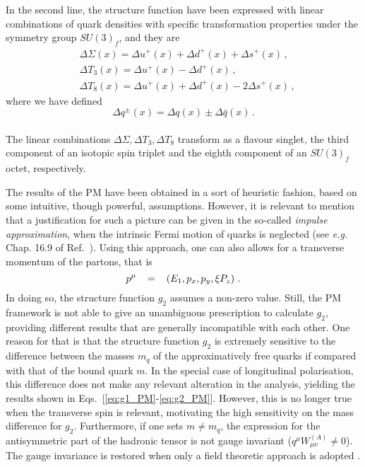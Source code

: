 In the second line, the structure function have been expressed with linear combinations of quark densities with specific transformation properties under the symmetry group $SU(3)_{f}$, and they are
\begin{align}
  & \Delta \Sigma (x) = \Delta u^{+} (x) + \Delta d^{+} (x) +\Delta s^{+} (x) \,, \\
  & \Delta T_3 (x) = \Delta u^{+} (x) - \Delta d^{+} (x) \,, \\
  & \Delta T_8 (x) = \Delta u^{+} (x) + \Delta d^{+} (x) - 2 \Delta s^{+} (x) \,,
\end{align}
where we have defined\\
\begin{equation}
 \Delta q^{\pm}(x) = \Delta q(x) \pm \Delta \bar{q}(x) \,.
\end{equation}
\\
The linear combinations $\Delta \Sigma, \Delta T_3, \Delta T_8$ transform as a flavour singlet, the third component of an isotopic spin triplet and the eighth component of an $SU(3)_{f}$ octet, respectively.\par 
The results of the PM have been obtained in a sort of heuristic fashion, based on some intuitive, though powerful, assumptions. However, it is relevant to mention that a justification for such a picture can be given in the so-called \textit{impulse approximation}, when the intrinsic Fermi motion of quarks is neglected (see \textit{e.g.} Chap. 16.9 of Ref.~\cite{leader_predazzi_1996}). Using this approach, one can also allows for a transverse momentum of the partons, that is 
\begin{equation}
  p^{\mu} \hspace{3mm}  = \hspace{3mm} \left( E_1, p_x, p_y, \xi P_{z} \right)\,.
\end{equation}
In doing so, the structure function $g_2$ assumes a non-zero value. Still, the PM framework is not able to give an unambiguous prescription to calculate $g_2$, providing different results that are generally incompatible with each other. One reason for that is that the structure function $g_2$ is extremely sensitive to the difference between the masses $m_q$ of the approximatively free quarks if compared with that of the bound quark $m$. In the special case of longitudinal polarisation, this difference does not make any relevant alteration in the analysis, yielding the results shown in Eqs.~[\ref{eq:g1_PM}-\ref{eq:g2_PM}]. However, this is no longer true when the transverse spin is relevant, motivating the high sensitivity on the mass difference for $g_2$. Furthermore, if one sets $m \neq m_{q}$, the expression for the antisymmetric part of the hadronic tensor is not gauge invariant ($q^{\mu} W_{\mu \nu}^{(A)} \neq 0$). The gauge invariance is restored when only a field theoretic approach is adopted \cite{Anselmino:1993tc}.\par


